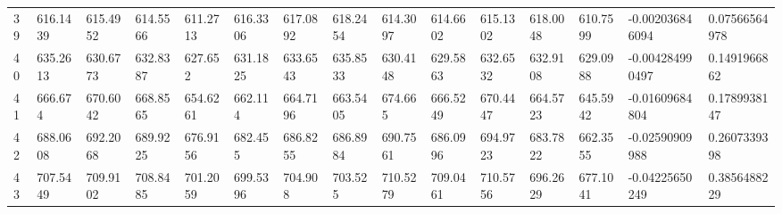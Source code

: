 \begin{landscape}
{\begin{longtable}{@{}lllllllllllllll@{}}
		39                                           & 616.1439                 & 615.4952                 & 614.5566                 & 611.2713                 & 616.3306                 & 617.0892                 & 618.2454                 & 614.3097                 & 614.6602                 & 615.1302                 & 618.0048                 & 610.7599                 & -0.002036846094                                                        & 0.07566564978                                   \\
		40                                           & 635.2613                 & 630.6773                 & 632.8387                 & 627.652                  & 631.1825                 & 633.6543                 & 635.8533                 & 630.4148                 & 629.5863                 & 632.6532                 & 632.9108                 & 629.0988                 & -0.004284990497                                                        & 0.1491966862                                    \\
		41                                           & 666.674                  & 670.6042                 & 668.8565                 & 654.6261                 & 662.114                  & 664.7196                 & 663.5405                 & 674.665                  & 666.5249                 & 670.4447                 & 664.5723                 & 645.5942                 & -0.01609684804                                                         & 0.1789938147                                    \\
		42                                           & 688.0608                 & 692.2068                 & 689.9225                 & 676.9156                 & 682.455                  & 686.8255                 & 686.8984                 & 690.7561                 & 686.0996                 & 694.9723                 & 683.7822                 & 662.3555                 & -0.02590909988                                                         & 0.2607339398                                    \\
		43                                           & 707.5449                 & 709.9102                 & 708.8485                 & 701.2059                 & 699.5396                 & 704.908                  & 703.525                  & 710.5279                 & 709.0461                 & 710.5756                 & 696.2629                 & 677.1041                 & -0.04225650249                                                         & 0.3856488229                                    \\

\end{longtable}}
\end{landscape}

